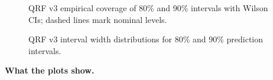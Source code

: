 \documentclass[
  a4paper,
  DIV=11,
  numbers=noendperiod]{scrreprt}
\begin{document}
\begin{figure}


\caption{\label{fig-qrf-v3-interval-coverage}QRF v3 empirical coverage
of 80\% and 90\% intervals with Wilson CIs; dashed lines mark nominal
levels.}

\end{figure}%

\begin{figure}


\caption{\label{fig-qrf-v3-width-distributions}QRF v3 interval width
distributions for 80\% and 90\% prediction intervals.}

\end{figure}%

\textbf{What the plots show.}
\end{document}
